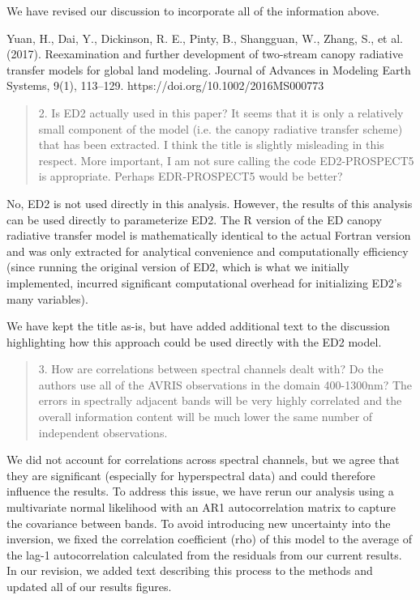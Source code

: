 We have revised our discussion to incorporate all of the information above.

\medskip
\noindent Yuan, H., Dai, Y., Dickinson, R. E., Pinty, B., Shangguan, W., Zhang, S., et al. (2017). Reexamination and further development of two-stream canopy radiative transfer models for global land modeling. Journal of Advances in Modeling Earth Systems, 9(1), 113–129. https://doi.org/10.1002/2016MS000773


\begin{quote}
  2. Is ED2 actually used in this paper? It seems that it is only a relatively small component of the model (i.e. the canopy radiative transfer scheme) that has been extracted. I think the title is slightly misleading in this respect. More important, I am not sure calling the code ED2-PROSPECT5 is appropriate. Perhaps EDR-PROSPECT5 would be better?
\end{quote}

No, ED2 is not used directly in this analysis. However, the results of this analysis can be used directly to parameterize ED2. The R version of the ED canopy radiative transfer model is mathematically identical to the actual Fortran version and was only extracted for analytical convenience and computationally efficiency (since running the original version of ED2, which is what we initially implemented, incurred significant computational overhead for initializing ED2’s many variables).

We have kept the title as-is, but have added additional text to the discussion highlighting how this approach could be used directly with the ED2 model.


\begin{quote}
  3. How are correlations between spectral channels dealt with? Do the authors use all of the AVRIS observations in the domain 400-1300nm? The errors in spectrally adjacent bands will be very highly correlated and the overall information content will be much lower the same number of independent observations.
\end{quote}

We did not account for correlations across spectral channels, but we agree that they are significant (especially for hyperspectral data) and could therefore influence the results. To address this issue, we have rerun our analysis using a multivariate normal likelihood with an AR1 autocorrelation matrix to capture the covariance between bands. To avoid introducing new uncertainty into the inversion, we fixed the correlation coefficient (rho) of this model to the average of the lag-1 autocorrelation calculated from the residuals from our current results. In our revision, we added text describing this process to the methods and updated all of our results figures.

